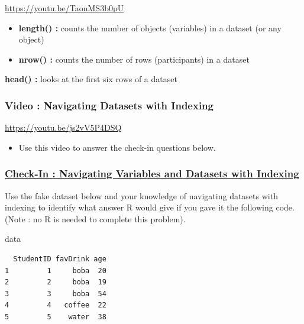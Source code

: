 \documentclass[
  letterpaper,
  DIV=11,
  numbers=noendperiod,
  oneside]{scrreprt}
\newenvironment{Shaded}{\begin{snugshade}}{\end{snugshade}}
\newcommand{\NormalTok}[1]{\textcolor[rgb]{0.00,0.23,0.31}{#1}}
\providecommand{\tightlist}{%
  \setlength{\itemsep}{0pt}\setlength{\parskip}{0pt}}\usepackage{longtable,booktabs,array}
\begin{document}
\url{https://youtu.be/TaonMS3b0pU}

\begin{itemize}
\item
  \textbf{length() :} counts the number of objects (variables) in a
  dataset (or any object)
\item
  \textbf{nrow() :} counts the number of rows (participants) in a
  dataset
\end{itemize}

\textbf{head() :} looks at the first six rows of a dataset

\subsubsection{Video : Navigating Datasets with
Indexing}\label{video-navigating-datasets-with-indexing}

\url{https://youtu.be/js2vV5P4DSQ}

\begin{itemize}
\tightlist
\item
  Use this video to answer the check-in questions below.
\end{itemize}

\subsubsection{\texorpdfstring{\href{https://docs.google.com/forms/d/e/1FAIpQLSeYROuiCU1wKb5W36k9IQIKMra2y5Wt9P84Er8WdBaQ6hvHNw/viewform?usp=sf_link}{Check-In
: Navigating Variables and Datasets with
Indexing}}{Check-In : Navigating Variables and Datasets with Indexing}}\label{check-in-navigating-variables-and-datasets-with-indexing}

Use the fake dataset below and your knowledge of navigating datasets
with indexing to identify what answer R would give if you gave it the
following code. (Note : no R is needed to complete this problem).

\begin{Shaded}
\begin{Highlighting}[]
\NormalTok{data}
\end{Highlighting}
\end{Shaded}

\begin{verbatim}
  StudentID favDrink age
1         1     boba  20
2         2     boba  19
3         3     boba  54
4         4   coffee  22
5         5    water  38
\end{verbatim}
\end{document}
